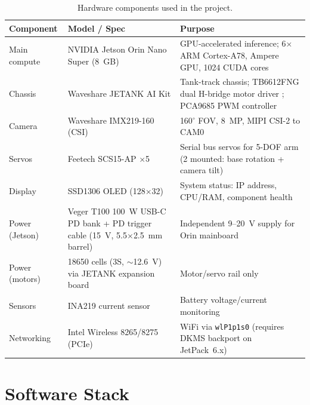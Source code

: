 \documentclass{imc-inf}
\begin{document}
\begin{table}[htbp]
\centering
\caption{Hardware components used in the project.}
\label{tab:hardware}
\footnotesize
\begin{tabular}{@{}p{0.9in}p{2.6in}p{1.8in}@{}}
\toprule
\textbf{Component} & \textbf{Model / Spec} & \textbf{Purpose} \\
\midrule
Main compute & NVIDIA Jetson Orin Nano Super (8~GB) & GPU-accelerated inference;
6$\times$ ARM Cortex-A78, Ampere GPU, 1024 CUDA cores \\
Chassis & Waveshare JETANK AI Kit & Tank-track chassis; TB6612FNG dual
H-bridge motor driver \cite{toshiba_tb6612fng}; PCA9685 PWM controller \cite{nxp_pca9685} \\
Camera & Waveshare IMX219-160 (CSI) & 160$^\circ$ FOV, 8~MP, MIPI CSI-2 to CAM0 \\
Servos & Feetech SCS15-AP $\times$5 & Serial bus servos for 5-DOF arm
(2 mounted: base rotation + camera tilt) \\
Display & SSD1306 OLED (128$\times$32) & System status: IP address, CPU/RAM,
component health \\
Power (Jetson) & Veger T100 100~W USB-C PD bank + PD trigger cable
(15~V, 5.5$\times$2.5~mm barrel) & Independent 9--20~V supply for Orin mainboard \\
Power (motors) & 18650 cells (3S, $\sim$12.6~V) via JETANK expansion board &
Motor/servo rail only \\
Sensors & INA219 current sensor & Battery voltage/current monitoring \\
Networking & Intel Wireless 8265/8275 (PCIe) & WiFi via \texttt{wlP1p1s0}
(requires DKMS backport on JetPack~6.x) \\
\bottomrule
\end{tabular}
\end{table}

\section{Software Stack}
\label{sec:software-stack}
\end{document}
